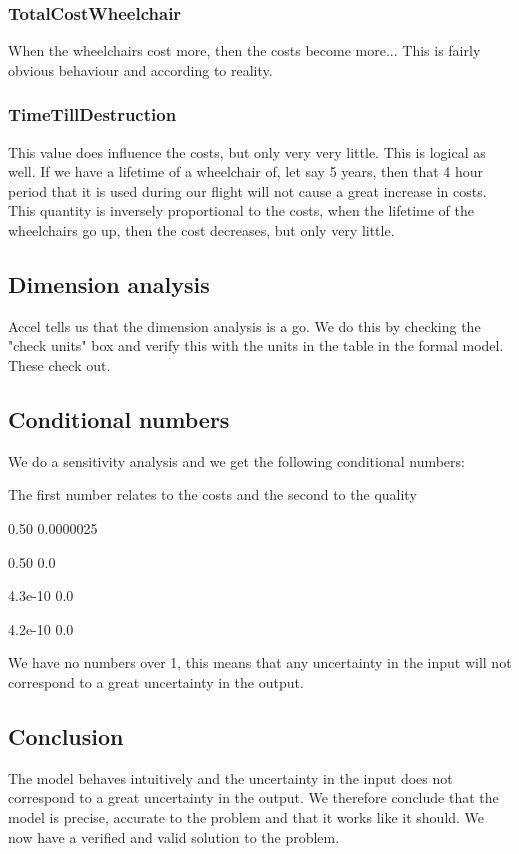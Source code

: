 \documentclass[a4paper, 11pt, notitlepage]{report}
\begin{document}
	\subsubsection{TotalCostWheelchair} When the wheelchairs cost more, then the costs become more... This is fairly obvious behaviour and according to reality.
	\subsubsection{TimeTillDestruction} This value does influence the costs, but only very very little. This is logical as well. If we have a lifetime of a wheelchair of, let say 5 years, then that 4 hour period that it is used during our flight will not cause a great increase in costs. This quantity is inversely proportional to the costs, when the lifetime of the wheelchairs go up, then the cost decreases, but only very little.
	
\subsection{Dimension analysis} Accel tells us that the dimension analysis is a go. We do this by checking the "check units" box and verify this with the units in the table in the formal model. These check out.

\subsection{Conditional numbers} We do a sensitivity analysis and we get the following conditional numbers:
\begin{description}
\item The first number relates to the costs and the second to the quality
	\item [Vescort]	0.50	0.0000025
	\item [WheelchairsPerMaintainer]		0.50	0.0
	\item [TotalCostWheelchair]		4.3e-10	0.0
	\item [TimeTillDestructionPerYear]		4.2e-10	0.0
	\end{description}
	We have no numbers over 1, this means that any uncertainty in the input will not correspond to a great uncertainty in the output.
	
\subsection{Conclusion} The model behaves intuitively and the uncertainty in the input does not correspond to a great uncertainty in the output. We therefore conclude that the model is precise, accurate to the problem and that it works like it should. We now have a verified and valid solution to the problem.
\end{document}
